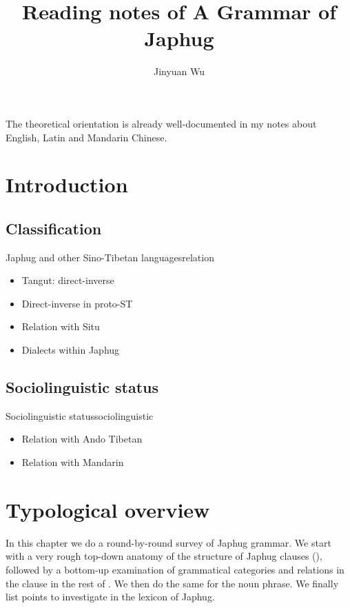 \documentclass[a4paper, oneside, 12pt]{report}
\title{Reading notes of A Grammar of Japhug}
\author{Jinyuan Wu}
\begin{document}
\maketitle

The theoretical orientation is already well-documented in my notes about English, Latin and Mandarin Chinese.

\chapter{Introduction}

\section{Classification}

\begin{todobox}{Japhug and other Sino-Tibetan languages}{relation}
    \begin{itemize}
        \item Tangut: direct-inverse
        \item Direct-inverse in proto-ST
        \item Relation with Situ
        \item Dialects within Japhug
    \end{itemize}
\end{todobox}

\section{Sociolinguistic status}

\begin{todobox}{Sociolinguistic status}{sociolinguistic}
    \begin{itemize}
        \item Relation with Ando Tibetan
        \item Relation with Mandarin
    \end{itemize}
\end{todobox}

\chapter{Typological overview}

In this chapter we do a round-by-round survey of Japhug grammar.
We start with a very rough top-down anatomy of the structure of Japhug clauses
(),
followed by a bottom-up examination of grammatical categories and relations in the clause
in the rest of .
We then do the same for the noun phrase.
We finally list points to investigate in the lexicon of Japhug.
\end{document}

